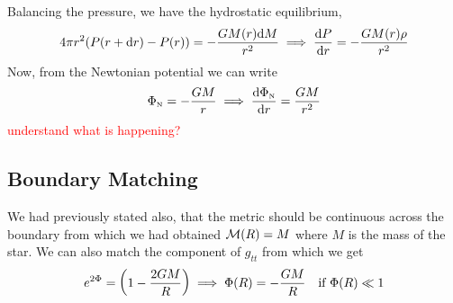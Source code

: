 Balancing the pressure, we have the hydrostatic equilibrium,
$$4\pi r^2(P(r+\dd r) - P(r)) = -\frac{GM(r)\dd M}{r^2}\implies \dv{P}{r} = -\frac{GM(r)\rho}{r^2}$$
Now, from the Newtonian potential we can write
$$\Phi_{\text{\tiny N}} = -\frac{GM}{r} \implies \dv{\Phi_{\text{\tiny N}} }{r} = \frac{GM}{r^2}$$
\textcolor{red}{understand what is happening?}
\subsection{Boundary Matching}
We had previously stated also, that the metric should be continuous across the boundary from which we had obtained $\mathcal M(R) = M$ where $M$ is the mass of the star. We can also match the component of $g_{tt}$ from which we get
$$e^{2\Phi} = \qty(1-\frac{2GM}{R}) \implies \Phi(R) = -\frac{GM}{R} \quad \text{if $\Phi(R)\ll 1$}$$